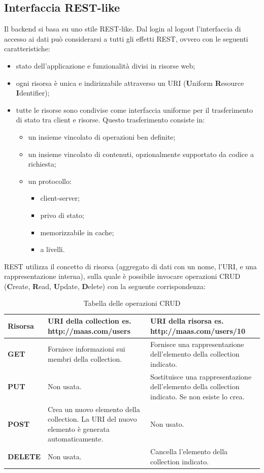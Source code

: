 \subsection{Interfaccia REST-like}
Il backend si basa su uno stile REST-like. Dal login al logout l'interfaccia di accesso ai dati può considerarsi a tutti gli effetti REST, ovvero con le seguenti caratteristiche:
\begin{itemize}
\item stato dell'applicazione e funzionalità divisi in risorse web;
\item ogni risorsa è unica e indirizzabile attraverso un URI (\textbf{U}niform \textbf{R}esource \textbf{I}dentifier);
\item tutte le risorse sono condivise come interfaccia uniforme per il trasferimento di stato tra client e risorse. Questo trasferimento consiste in:
\begin{itemize}
\item un insieme vincolato di operazioni ben definite;
\item un insieme vincolato di contenuti, opzionalmente supportato da codice a richiesta;
\item un protocollo:
\begin{itemize}
\item client-server;
\item privo di stato;
\item memorizzabile in cache;
\item a livelli.
\end{itemize}
\end{itemize}
\end{itemize}
REST utilizza il concetto di risorsa (aggregato di dati con un nome, l'URI, e una rappresentazione interna), sulla quale è possibile invocare operazioni CRUD (\textbf{C}reate, \textbf{R}ead, \textbf{U}pdate, \textbf{D}elete) con la seguente corrispondenza:
\begin{table}[H]
\centering
\label{CRUD}
\begin{tabular}{| >{\centering}p{3cm} | >{\centering}p{5cm} | >{\centering}p{6cm} |}
\hline
\textbf{Risorsa} & \textbf{URI della collection} \newline es. http://maas.com/users & \textbf{URI della risorsa} \newline es. http://maas.com/users/10 \tabularnewline \hline
\textbf{GET} & Fornisce informazioni sui membri della collection. & Fornisce una rappresentazione dell'elemento della collection indicato. \tabularnewline \hline
\textbf{PUT} & Non usata. & Sostituisce una rappresentazione dell'elemento della collection indicato. Se non esiste lo crea.  \tabularnewline \hline
\textbf{POST} & Crea un nuovo elemento della collection. La URI del nuovo elemento è generata automaticamente. & Non usato. \tabularnewline \hline
\textbf{DELETE} & Non usata. & Cancella l'elemento della collection indicato. \tabularnewline \hline
\end{tabular}
\caption{Tabella delle operazioni CRUD}
\end{table}
